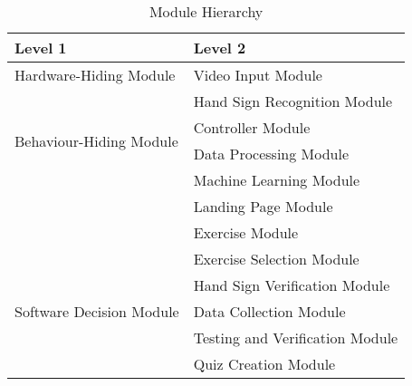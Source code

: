 \documentclass[12pt, titlepage]{article}
\begin{document}
\begin{table}[h!]
\centering
\begin{tabular}{p{} p{}}
\toprule
\textbf{Level 1} & \textbf{Level 2}\\
\midrule

\multirow{1}{0.3\textwidth}{Hardware-Hiding Module} 
& Video Input Module\\
\midrule

\multirow{4}{0.3\textwidth}{Behaviour-Hiding Module} 
& Hand Sign Recognition Module\\
& Controller Module \\
& Data Processing Module \\
& Machine Learning Module \\
& Landing Page Module \\
& Exercise Module \\
& Exercise Selection Module \\
\midrule

\multirow{3}{0.3\textwidth}{Software Decision Module} 
& Hand Sign Verification Module \\
& Data Collection Module \\
& Testing and Verification Module \\
& Quiz Creation Module \\
\bottomrule

\end{tabular}
\caption{Module Hierarchy}
\label{TblMH}
\end{table}

\newpage






\end{document}
